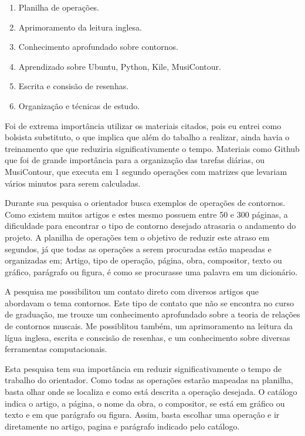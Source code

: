 \documentclass[11pt]{article}
\begin{document}
\begin{enumerate} 
\item Planilha de operações.
\item Aprimoramento da leitura inglesa.
\item Conhecimento aprofundado sobre contornos.
\item Aprendizado sobre Ubuntu, Python, Kile, MusiContour.
\item Escrita e consisão de resenhas.
\item Organização e técnicas de estudo.
\end{enumerate}


\label{sec:discussao}

Foi de extrema importância utilizar os materiais citados, pois eu entrei como bolsista 
substituto, o que implica que além do tabalho a realizar, ainda havia o treinamento que
que reduziria significativamente o tempo. Materiais como Github que foi de grande importância 
para a organização das tarefas diárias, ou MusiContour, que executa em 1 segundo operações
com matrizes que levariam vários minutos para serem calculadas.

Durante sua pesquisa o orientador busca exemplos de operações de contornos. Como existem
muitos artigos e estes mesmo possuem entre 50 e 300 páginas, a dificuldade para encontrar
o tipo de contorno desejado atrasaria o andamento do projeto. A planilha de operações tem o
objetivo de reduzir este atraso em segundos, já que todas as operações a serem procuradas
estão mapeadas e organizadas em; Artigo, tipo de operação, página, obra, compositor, texto ou gráfico,
parágrafo ou figura, é como se procurasse uma palavra em um dicionário.

A pesquisa me possibilitou um contato direto com diversos artigos que abordavam
o tema contornos. Este tipo de contato que não se encontra no curso de graduação, 
me trouxe um conhecimento aprofundado sobre a teoria de relações de contornos muscais. 
Me possiblitou também, um aprimoramento na leitura da lígua inglesa, escrita e conscisão 
de resenhas, e um conhecimento sobre diversas ferramentas computacionais.

Esta pesquisa tem sua importância em reduzir significativamente o
tempo de trabalho do orientador. Como todas as operações estarão mapeadas
na planilha, basta olhar onde se localiza e como está descrita a operação
desejada. O catálogo indica o artigo, a página, o nome da obra, o compositor,
se está em gráfico ou texto e em que parágrafo ou figura. Assim, basta escolhar 
uma operação e ir diretamente no artigo, pagina e parágrafo indicado pelo
catálogo.
\end{document}
